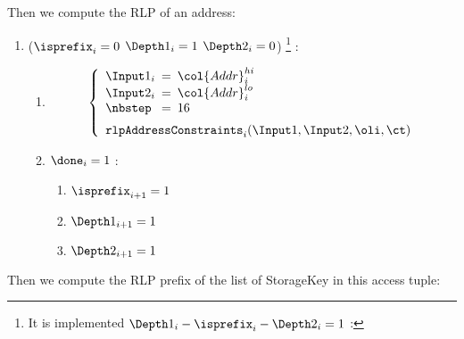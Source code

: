 Then we compute the RLP of an address:
\begin{enumerate}[resume]
	\item \If ($\isprefix_{i}=0$ \et $\Depth1_{i}=1$ \et $\Depth2_{i}=0$) \footnote{It is implemented \If  $\Depth1_{i} - \isprefix_{i} - \Depth2_{i}=1$ \Then:} \Then:
	\begin{enumerate}
	\item
        \[
        \left\{
        \begin{array}{lcl}
            \Input1_{i} & \!\!\! = \!\!\! & \col{Addr}^{hi}_{i} \\
            \Input2_{i} & \!\!\! = \!\!\! & \col{Addr}^{lo}_{i} \\
            \nbstep & \!\!\! = \!\!\! & 16 \vspace{2mm} \\
            \multicolumn{3}{l}{\texttt{rlpAddressConstraints}_{i}(\Input1, \Input2, \oli, \ct)} \\
        \end{array}
        \right.
        \]
	 	\item \If $\done_{i}=1$ \Then:
	 	\begin{enumerate}
	 		\item $\isprefix_{i+1}=1$
	 		\item $\Depth1_{i+1}=1$
	 		\item $\Depth2_{i+1}=1$
	 	\end{enumerate}
	\end{enumerate}
\end{enumerate}
Then we compute the RLP prefix of the list of StorageKey in this access tuple:

